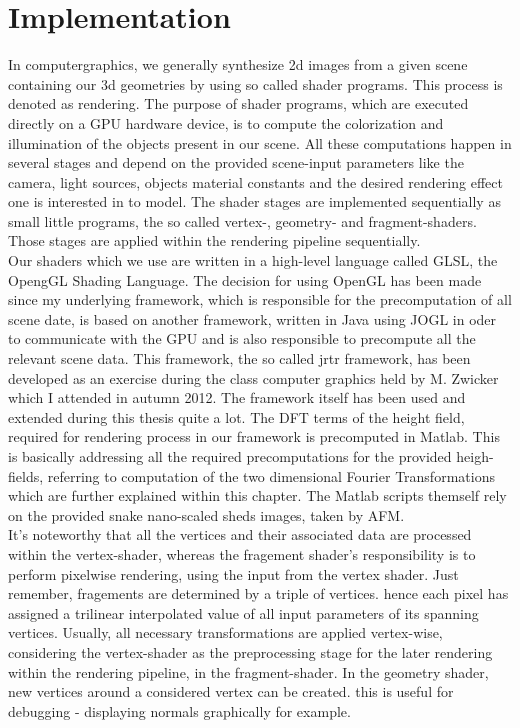 \chapter{Implementation}
In computergraphics, we generally synthesize 2d images from a given scene containing our 3d geometries by using so called shader programs. This process is denoted as rendering. The purpose of shader programs, which are executed directly on a GPU hardware device, is to compute the colorization and illumination of the objects present in our scene. All these computations happen in several stages and depend on the provided scene-input parameters like the camera, light sources, objects material constants and the desired rendering effect one is interested in to model. The shader stages are implemented sequentially as small little programs, the so called vertex-, geometry- and fragment-shaders. Those stages are applied within the rendering pipeline sequentially. \\

Our shaders which we use are written in a high-level language called GLSL, the OpengGL Shading Language. The decision for using OpenGL has been made since my underlying framework, which is responsible for the precomputation of all scene date, is based on another framework, written in Java using JOGL in oder to communicate with the GPU and is also responsible to precompute all the relevant scene data. This framework, the so called jrtr framework, has been developed as an exercise during the class computer graphics held by M. Zwicker which I attended in autumn 2012. The framework itself has been used and extended during this thesis quite a lot. The DFT terms of the height field, required for rendering process in our framework is precomputed in Matlab. This is basically addressing all the required precomputations for the provided heigh-fields, referring to computation of the two dimensional Fourier Transformations which are further explained within this chapter. The Matlab scripts themself rely on the provided snake nano-scaled sheds images, taken by AFM. \\

It's noteworthy that all the vertices and their associated data are processed within the vertex-shader, whereas the fragement shader's responsibility is to perform pixelwise rendering, using the input from the vertex shader. Just remember, fragements are determined by a triple of vertices. hence each pixel has assigned a trilinear interpolated value of all input parameters of its spanning vertices. Usually, all necessary transformations are applied vertex-wise, considering the vertex-shader as the preprocessing stage for the later rendering within the rendering pipeline, in the fragment-shader. In the geometry shader, new vertices around a considered vertex can be created. this is useful for debugging - displaying normals graphically for example. \\

